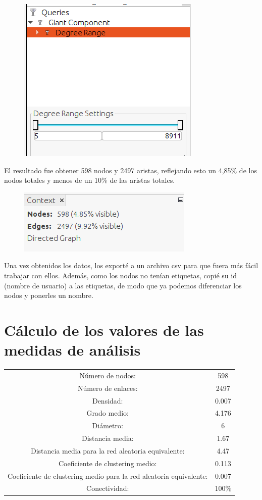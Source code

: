 \begin{figure}[H]
	\centering
	\includegraphics[width=0.2\linewidth]{Imagenes/screenshot001}
\end{figure}


El resultado fue obtener 598 nodos y 2497 aristas, reflejando esto un 4,85\% de
los nodos totales y menos de un 10\% de las aristas totales.

\begin{figure}[H]
	\centering
	\includegraphics[width=0.35\linewidth]{Imagenes/screenshot002}
\end{figure}

Una vez obtenidos los datos, los exporté a un archivo csv para que fuera más
fácil trabajar con ellos. Además, como los nodos no tenían etiquetas, copié su
id (nombre de usuario) a las etiquetas, de modo que ya podemos diferenciar los
nodos y ponerles un nombre.


\section{Cálculo de los valores de las medidas de análisis}

\begin{center}
	\begin{tabular}{ c c }
		Número de nodos: & 598  \\ 
		Número de enlaces: & 2497  \\  
		Densidad: & 0.007  \\
		Grado medio: & 4.176 \\  
		Diámetro: & 6 \\
		Distancia media: &  1.67 \\ 
		Distancia media para la red aleatoria equivalente: & 4.47 \\ 
		Coeficiente de clustering medio: & 0.113 \\ 
		Coeficiente de clustering medio para la red aleatoria equivalente: & 0.007 \\ 
		Conectividad: & 100\%
	\end{tabular}
\end{center}

